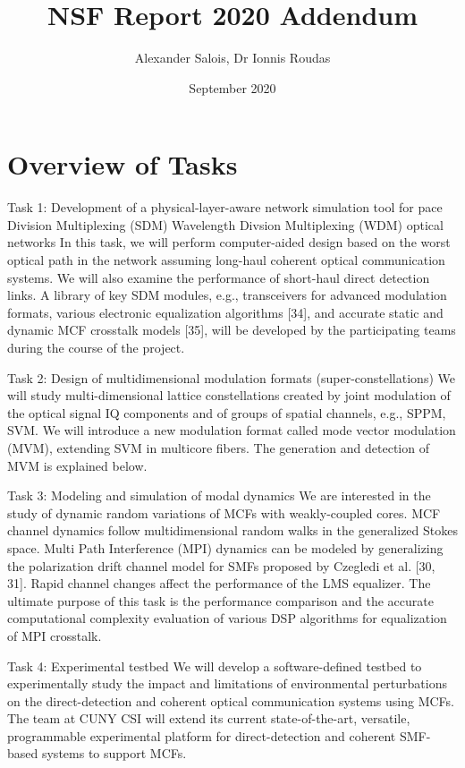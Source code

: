 \documentclass{report}
\title{NSF Report 2020 Addendum}
\author{Alexander Salois, Dr Ionnis Roudas}
\date{September 2020}
\begin{document}
\maketitle

\section{Overview of Tasks}
Task 1: Development of a physical-layer-aware network simulation tool for pace Division Multiplexing (SDM) Wavelength Divsion Multiplexing (WDM) optical networks
In this task, we will perform computer-aided design based on the worst optical path in the network assuming long-haul coherent optical communication systems. We will also examine the performance of short-haul direct detection links. A library of key SDM modules, e.g., transceivers for advanced modulation formats, various electronic equalization algorithms [34], and accurate static and dynamic MCF crosstalk models [35], will be developed by the participating teams during the course of the project.


Task 2: Design of multidimensional modulation formats (super-constellations)
We will study multi-dimensional lattice constellations created by joint modulation of the optical signal IQ components and of groups of spatial channels, e.g., SPPM, SVM. We will introduce a new modulation format called mode vector modulation (MVM), extending SVM in multicore fibers. The generation and detection of MVM is explained below.


Task 3: Modeling and simulation of modal dynamics
We are interested in the study of dynamic random variations of MCFs with weakly-coupled cores. MCF channel dynamics follow multidimensional random walks in the generalized Stokes space. Multi Path Interference (MPI) dynamics can be modeled by generalizing the polarization drift channel model for SMFs proposed by Czegledi et al. [30, 31]. Rapid channel changes affect the performance of the LMS equalizer. The ultimate purpose of this task is the performance comparison and the accurate computational complexity evaluation of various DSP algorithms for equalization of MPI crosstalk.


Task 4: Experimental testbed
We will develop a software-defined testbed to experimentally study the impact and limitations of environmental perturbations on the direct-detection and coherent optical communication systems using MCFs. The team at CUNY CSI will extend its current state-of-the-art, versatile, programmable experimental platform for direct-detection and coherent SMF-based systems to support MCFs.
\end{document}
